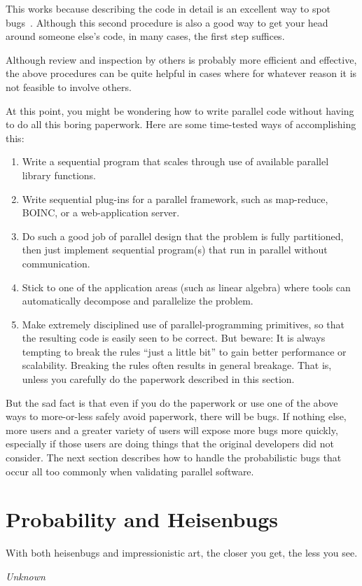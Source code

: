 This works because describing the code in detail is an excellent way to spot
bugs~\cite{GlenfordJMyers1979}.
Although this second procedure is also a good way to get your head around
someone else's code, in many cases, the first step suffices.

Although review and inspection by others is probably more efficient and
effective, the above procedures can be quite helpful in cases where
for whatever reason it is not feasible to involve others.

At this point, you might be wondering how to write parallel code without
having to do all this boring paperwork.
Here are some time-tested ways of accomplishing this:

\begin{enumerate}
\item	Write a sequential program that scales through use of
	available parallel library functions.
\item	Write sequential plug-ins for a parallel framework,
	such as map-reduce, BOINC, or a web-application server.
\item	Do such a good job of parallel design that the problem
	is fully partitioned, then just implement sequential
	program(s) that run in parallel without communication.
\item	Stick to one of the application areas (such as linear algebra)
	where tools can automatically decompose and parallelize
	the problem.
\item	Make extremely disciplined use of parallel-programming
	primitives, so that the resulting code is easily seen to be correct.
	But beware: It is always tempting to break the rules
	``just a little bit'' to gain better performance or
	scalability.
	Breaking the rules often results in general breakage.
	That is, unless you carefully do the paperwork described in this
	section.
\end{enumerate}

But the sad fact is that even if you do the paperwork or use one of
the above ways to more-or-less safely avoid paperwork,
there will be bugs.
If nothing else, more users and a greater variety of users will expose
more bugs more quickly, especially if those users are doing things
that the original developers did not consider.
The next section describes how to handle the probabilistic bugs that
occur all too commonly when validating parallel software.

\section{Probability and Heisenbugs}
\label{sec:debugging:Probability and Heisenbugs}
%
\epigraph{With both heisenbugs and impressionistic art, the closer you
	  get, the less you see.}
	 {\emph{Unknown}}

